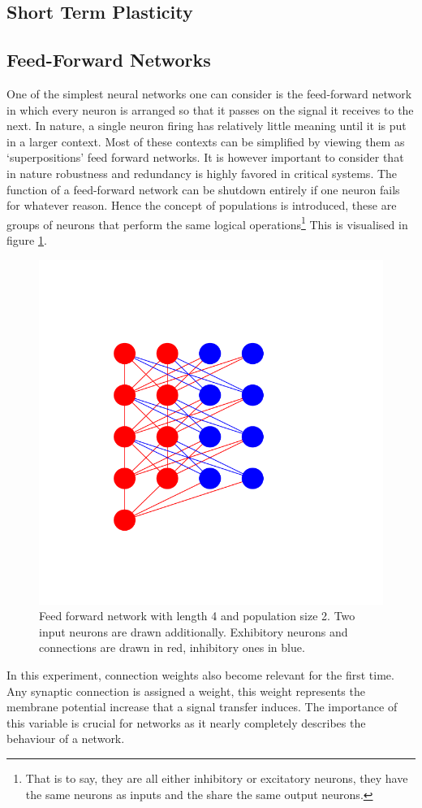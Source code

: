 \documentclass[10pt,a4paper]{article}
\begin{document}
\subsection{Short Term Plasticity}

\subsection{Feed-Forward Networks}
One of the simplest neural networks one can consider is the feed-forward
network in which every neuron is arranged so that it passes on the signal it
receives to the next. In nature, a single neuron firing has relatively little
meaning until it is put in a larger context. Most of these contexts can be
simplified by viewing them as `superpositions' feed forward networks. It is
however important to consider that in nature robustness and redundancy is
highly favored in critical systems. The function of a feed-forward network can
be shutdown entirely if one neuron fails for whatever reason. Hence the concept
of populations is introduced, these are groups of neurons that perform the same
logical operations\footnote{That is to say, they are all either inhibitory or
excitatory neurons, they have the same neurons as inputs and the share the same
output neurons.} This is visualised in figure \ref{fig:feed-forward}.

\begin{figure}
    \centering
    \includegraphics[width=.5\textwidth]{figures/feedforwardnetwork.png}
    \caption{Feed forward network with length 4 and population size 2. Two input
        neurons are drawn additionally. Exhibitory neurons and connections are drawn
        in red, inhibitory ones in blue.}
    \label{fig:feed-forward}
\end{figure}

In this experiment, connection weights also become relevant for the first time.
Any synaptic connection is assigned a weight, this weight represents the
membrane potential increase that a signal transfer induces. The importance of
this variable is crucial for networks as it nearly completely describes the
behaviour of a network.
\end{document}
